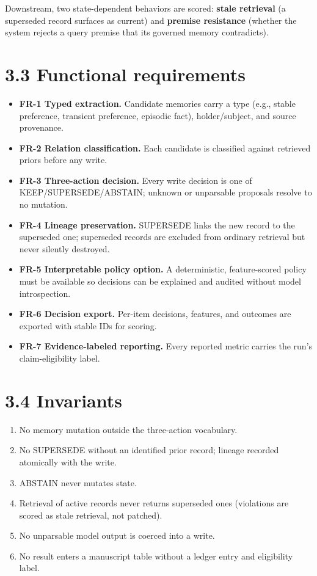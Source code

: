 Downstream, two state-dependent behaviors are scored: \textbf{stale
retrieval} (a superseded record surfaces as current) and \textbf{premise
resistance} (whether the system rejects a query premise that its
governed memory contradicts).

\section{3.3 Functional requirements}\label{functional-requirements}

\begin{itemize}
\tightlist
\item
  \textbf{FR-1 Typed extraction.} Candidate memories carry a type (e.g.,
  stable preference, transient preference, episodic fact),
  holder/subject, and source provenance.
\item
  \textbf{FR-2 Relation classification.} Each candidate is classified
  against retrieved priors before any write.
\item
  \textbf{FR-3 Three-action decision.} Every write decision is one of
  KEEP/SUPERSEDE/ABSTAIN; unknown or unparsable proposals resolve to no
  mutation.
\item
  \textbf{FR-4 Lineage preservation.} SUPERSEDE links the new record to
  the superseded one; superseded records are excluded from ordinary
  retrieval but never silently destroyed.
\item
  \textbf{FR-5 Interpretable policy option.} A deterministic,
  feature-scored policy must be available so decisions can be explained
  and audited without model introspection.
\item
  \textbf{FR-6 Decision export.} Per-item decisions, features, and
  outcomes are exported with stable IDs for scoring.
\item
  \textbf{FR-7 Evidence-labeled reporting.} Every reported metric
  carries the run's claim-eligibility label.
\end{itemize}

\section{3.4 Invariants}\label{invariants}

\begin{enumerate}
\def\labelenumi{\arabic{enumi}.}
\tightlist
\item
  No memory mutation outside the three-action vocabulary.
\item
  No SUPERSEDE without an identified prior record; lineage recorded
  atomically with the write.
\item
  ABSTAIN never mutates state.
\item
  Retrieval of active records never returns superseded ones (violations
  are scored as stale retrieval, not patched).
\item
  No unparsable model output is coerced into a write.
\item
  No result enters a manuscript table without a ledger entry and
  eligibility label.
\end{enumerate}

